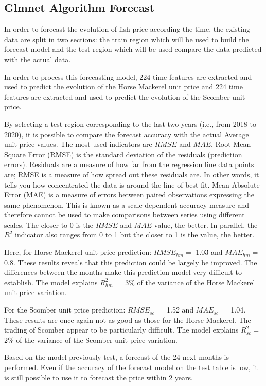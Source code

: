 \documentclass[10,a4paperpaper,]{article}
\begin{document}
\subsection{Glmnet Algorithm Forecast}

In order to forecast the evolution of fish price according the time, the
existing data are split in two sections: the train region which will be
used to build the forecast model and the test region which will be used
compare the data predicted with the actual data.

In order to process this forecasting model, 224 time features are
extracted and used to predict the evolution of the Horse Mackerel unit
price and 224 time features are extracted and used to predict the
evolution of the Scomber unit price.

By selecting a test region corresponding to the last two years (i.e.,
from 2018 to 2020), it is possible to compare the forecast accuracy with
the actual Average unit price values. The most used indicators are
\(RMSE\) and \(MAE\). Root Mean Square Error (RMSE) is the standard
deviation of the residuals (prediction errors). Residuals are a measure
of how far from the regression line data points are; RMSE is a measure
of how spread out these residuals are. In other words, it tells you how
concentrated the data is around the line of best fit. Mean Absolute
Error (MAE) is a measure of errors between paired observations
expressing the same phenomenon. This is known as a scale-dependent
accuracy measure and therefore cannot be used to make comparisons
between series using different scales. The closer to 0 is the \(RMSE\)
and \(MAE\) value, the better. In parallel, the \(R^2\) indicator also
ranges from 0 to 1 but the closer to 1 is the value, the better.

Here, for Horse Mackerel unit price prediction: \(RMSE_{hm} =\) 1.03 and
\(MAE_{hm} =\) 0.8. These results reveals that this prediction could be
largely be improved. The differences between the months make this
prediction model very difficult to establish. The model explains
\(R^2_{hm} =\) 3\% of the variance of the Horse Mackerel unit price
variation.

For the Scomber unit price prediction: \(RMSE_{sc} =\) 1.52 and
\(MAE_{sc} =\) 1.04. These results are once again not as good as those
for the Horse Mackerel. The trading of Scomber appear to be particularly
difficult. The model explains \(R^2_{sc} =\) 2\% of the variance of the
Scomber unit price variation.

Based on the model previously test, a forecast of the 24 next months is
performed. Even if the accuracy of the forecast model on the test table
is low, it is still possible to use it to forecast the price within 2
years.
\end{document}

